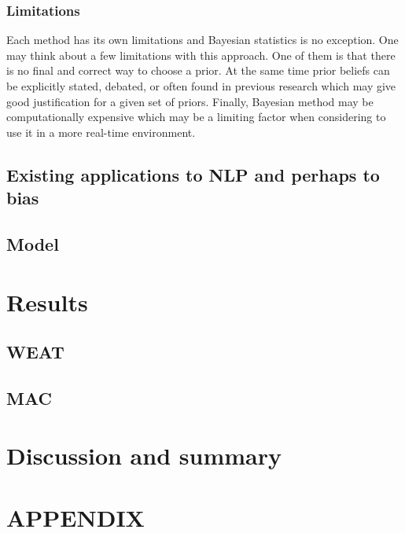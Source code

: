\documentclass[
  10pt,
  dvipsnames,enabledeprecatedfontcommands, twocolumn]{scrartcl}
\begin{document}
\hypertarget{limitations}{%
\subsubsection{Limitations}\label{limitations}}

Each method has its own limitations and Bayesian statistics is no
exception. One may think about a few limitations with this approach. One
of them is that there is no final and correct way to choose a prior. At
the same time prior beliefs can be explicitly stated, debated, or often
found in previous research which may give good justification for a given
set of priors. Finally, Bayesian method may be computationally expensive
which may be a limiting factor when considering to use it in a more
real-time environment.

\hypertarget{existing-applications-to-nlp-and-perhaps-to-bias}{%
\subsection{Existing applications to NLP and perhaps to
bias}\label{existing-applications-to-nlp-and-perhaps-to-bias}}

\hypertarget{model}{%
\subsection{Model}\label{model}}

\hypertarget{results}{%
\section{Results}\label{results}}

\hypertarget{weat}{%
\subsection{WEAT}\label{weat}}

\hypertarget{mac}{%
\subsection{MAC}\label{mac}}

\hypertarget{discussion-and-summary}{%
\section{Discussion and summary}\label{discussion-and-summary}}

\hypertarget{appendix}{%
\section{APPENDIX}\label{appendix}}
\end{document}
